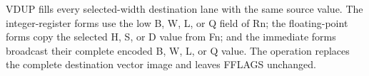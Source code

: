 VDUP fills every selected-width destination lane with the same source value.
The integer-register forms use the low B, W, L, or Q field of Rn; the
floating-point forms copy the selected H, S, or D value from Fn; and the
immediate forms broadcast their complete encoded B, W, L, or Q value. The
operation replaces the complete destination vector image and leaves FFLAGS
unchanged.

